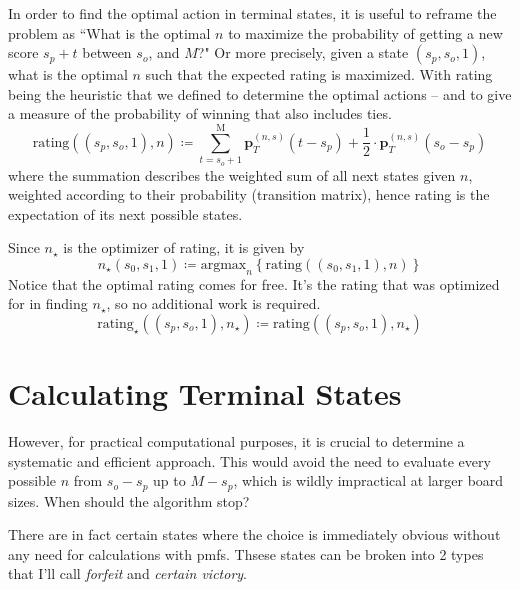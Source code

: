 \documentclass[a4paper]{article}
\begin{document}
In order to find the optimal action in terminal states, it is useful to reframe the problem as ``What is the optimal $n$ to maximize the probability of getting a new score $s_p + t$ between $s_o$, and $M$?" Or more precisely, given a state $(s_p, s_o, 1)$, what is the optimal $n$ such that the expected rating is maximized. With rating being the heuristic that we defined to determine the optimal actions -- and to give a measure of the probability of winning that also includes ties. 
%
\begin{equation}
    \text{rating}((s_p, s_o, 1), n) \coloneqq \sum_{t = s_o+1}^{\text{M}} \textbf{p}_{T}^{(n, s)}(t - s_p) + \frac{1}{2} \cdot \textbf{p}_{T}^{(n, s)}(s_o - s_p)
\end{equation}
%
where the summation describes the weighted sum of all next states given $n$, weighted according to their probability (transition matrix), hence rating is the expectation of its next possible states. 

Since $n_{\star}$ is the optimizer of rating, it is given by
%
\begin{equation}
    n_{\star}(s_0, s_1, 1) \coloneqq \text{argmax}_n \left\{ \text{rating}((s_0, s_1, 1), n) \right\}
\end{equation}
%
Notice that the optimal rating comes for free. It's the rating that was optimized for in finding $n_{\star}$, so no additional work is required.
%
\begin{equation}
    \text{rating}_{\star}((s_p, s_o, 1), n_{\star}) \coloneqq \text{rating}((s_p, s_o, 1), n_{\star})
\end{equation}


\section{Calculating Terminal States}

However, for practical computational purposes, it is crucial to determine a systematic and efficient approach. This would avoid the need to evaluate every possible $n$ from $s_o - s_p$ up to $M - s_p$, which is wildly impractical at larger board sizes. When should the algorithm stop?

There are in fact certain states where the choice is immediately obvious without any need for calculations with pmfs. Thsese states can be broken into 2 types that I'll call \textit{forfeit} and \textit{certain victory}. 
\end{document}
